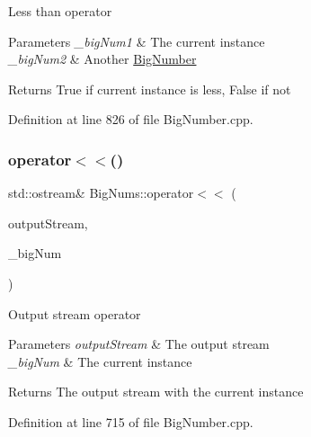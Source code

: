 Less than operator 
\begin{DoxyParams}{Parameters}
{\em \+\_\+big\+Num1} & The current instance \\
\hline
{\em \+\_\+big\+Num2} & Another \mbox{\hyperlink{class_big_nums_1_1_big_number}{Big\+Number}} \\
\hline
\end{DoxyParams}
\begin{DoxyReturn}{Returns}
True if current instance is less, False if not 
\end{DoxyReturn}


Definition at line 826 of file Big\+Number.\+cpp.

\mbox{\label{namespace_big_nums_aa974f80c6eaffabdcb244efbfc8ef40f}} 
\subsubsection{\texorpdfstring{operator$<$$<$()}{operator<<()}\hspace{0.1cm}{\footnotesize\ttfamily [1/2]}}
{\footnotesize\ttfamily std\+::ostream\& Big\+Nums\+::operator$<$$<$ (\begin{DoxyParamCaption}\item[{std\+::ostream \&}]{output\+Stream,  }\item[{const \mbox{\hyperlink{class_big_nums_1_1_big_number}{Big\+Number}} \&}]{\+\_\+big\+Num }\end{DoxyParamCaption})}

Output stream operator 
\begin{DoxyParams}{Parameters}
{\em output\+Stream} & The output stream \\
\hline
{\em \+\_\+big\+Num} & The current instance \\
\hline
\end{DoxyParams}
\begin{DoxyReturn}{Returns}
The output stream with the current instance 
\end{DoxyReturn}


Definition at line 715 of file Big\+Number.\+cpp.

\mbox{\label{namespace_big_nums_a7fae187d94a5f4c3869ca24f68826cef}} 
